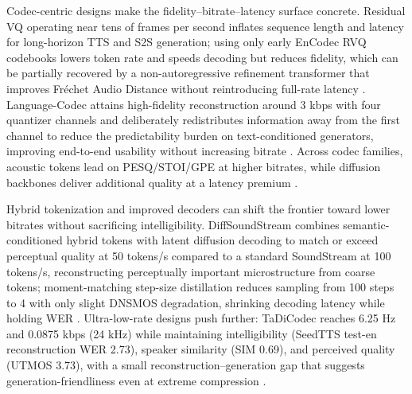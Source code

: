 Codec-centric designs make the fidelity–bitrate–latency surface concrete. Residual VQ operating near tens of frames per second inflates sequence length and latency for long-horizon TTS and S2S generation; using only early EnCodec RVQ codebooks lowers token rate and speeds decoding but reduces fidelity, which can be partially recovered by a non-autoregressive refinement transformer that improves Fréchet Audio Distance without reintroducing full-rate latency . Language-Codec attains high-fidelity reconstruction around 3 kbps with four quantizer channels and deliberately redistributes information away from the first channel to reduce the predictability burden on text-conditioned generators, improving end-to-end usability without increasing bitrate \cite{ji2025languagecodecbridgingdiscreterepresentat}. Across codec families, acoustic tokens lead on PESQ/STOI/GPE at higher bitrates, while diffusion backbones deliver additional quality at a latency premium \cite{guo2025recentadvancesdiscretespeechtokensreview}.



Hybrid tokenization and improved decoders can shift the frontier toward lower bitrates without sacrificing intelligibility. DiffSoundStream combines semantic-conditioned hybrid tokens with latent diffusion decoding to match or exceed perceptual quality at 50 tokens/s compared to a standard SoundStream at 100 tokens/s, reconstructing perceptually important microstructure from coarse tokens; moment-matching step-size distillation reduces sampling from 100 steps to 4 with only slight DNSMOS degradation, shrinking decoding latency while holding WER \cite{yang2025diffsoundstreamefficientspeechtokenizati}. Ultra-low-rate designs push further: TaDiCodec reaches 6.25 Hz and 0.0875 kbps (24 kHz) while maintaining intelligibility (SeedTTS test-en reconstruction WER 2.73), speaker similarity (SIM 0.69), and perceived quality (UTMOS 3.73), with a small reconstruction–generation gap that suggests generation-friendliness even at extreme compression \cite{wang2025tadicodectextawarediffusionspeechtokeniz}.



